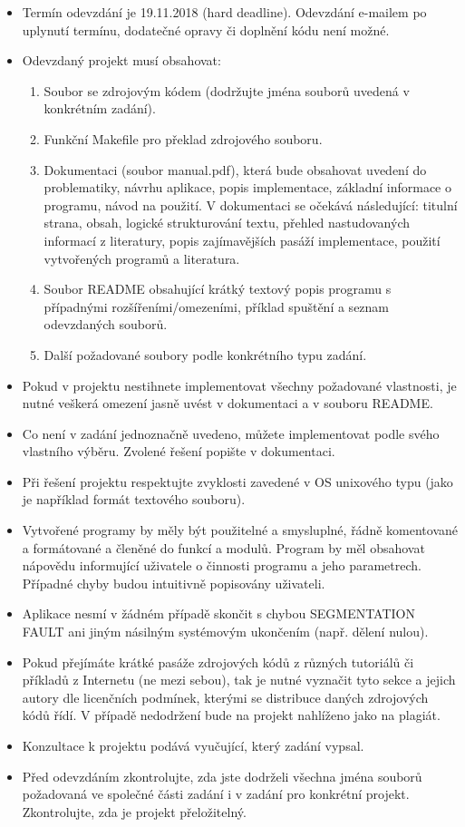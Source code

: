 \documentclass[11pt, a4paper, titlepage]{article}
\begin{document}
\begin{itemize}
	\item Termín odevzdání je 19.11.2018 (hard deadline). Odevzdání e-mailem po uplynutí termínu, dodatečné opravy či doplnění kódu není možné.
	\item Odevzdaný projekt musí obsahovat:
	\begin{enumerate}
		\item Soubor se zdrojovým kódem (dodržujte jména souborů uvedená v konkrétním zadání).
		\item Funkční Makefile pro překlad zdrojového souboru.
		\item Dokumentaci (soubor manual.pdf), která bude obsahovat uvedení do problematiky, návrhu aplikace, popis implementace, základní informace o programu, návod na použití. V dokumentaci se očekává následující: titulní strana, obsah, logické strukturování textu, přehled nastudovaných informací z literatury, popis zajímavějších pasáží implementace, použití vytvořených programů a literatura.
		\item Soubor README obsahující krátký textový popis programu s případnými rozšířeními/omezeními, příklad spuštění a seznam odevzdaných souborů.
		\item Další požadované soubory podle konkrétního typu zadání.
	\end{enumerate}
	\item Pokud v projektu nestihnete implementovat všechny požadované vlastnosti, je nutné veškerá omezení jasně uvést v dokumentaci a v souboru README.
	\item Co není v zadání jednoznačně uvedeno, můžete implementovat podle svého vlastního výběru. Zvolené řešení popište v dokumentaci.
	\item Při řešení projektu respektujte zvyklosti zavedené v OS unixového typu (jako je například formát textového souboru).
	\item Vytvořené programy by měly být použitelné a smysluplné, řádně komentované a formátované a členěné do funkcí a modulů. Program by měl obsahovat nápovědu informující uživatele o činnosti programu a jeho parametrech. Případné chyby budou intuitivně popisovány uživateli.
	\item Aplikace nesmí v žádném případě skončit s chybou SEGMENTATION FAULT ani jiným násilným systémovým ukončením (např. dělení nulou).
	\item Pokud přejímáte krátké pasáže zdrojových kódů z různých tutoriálů či příkladů z Internetu (ne mezi sebou), tak je nutné vyznačit tyto sekce a jejich autory dle licenčních podmínek, kterými se distribuce daných zdrojových kódů řídí. V případě nedodržení bude na projekt nahlíženo jako na plagiát.
	\item Konzultace k projektu podává vyučující, který zadání vypsal.
	\item Před odevzdáním zkontrolujte, zda jste dodrželi všechna jména souborů požadovaná ve společné části zadání i v zadání pro konkrétní projekt. Zkontrolujte, zda je projekt přeložitelný.
\end{itemize}
\end{document}
